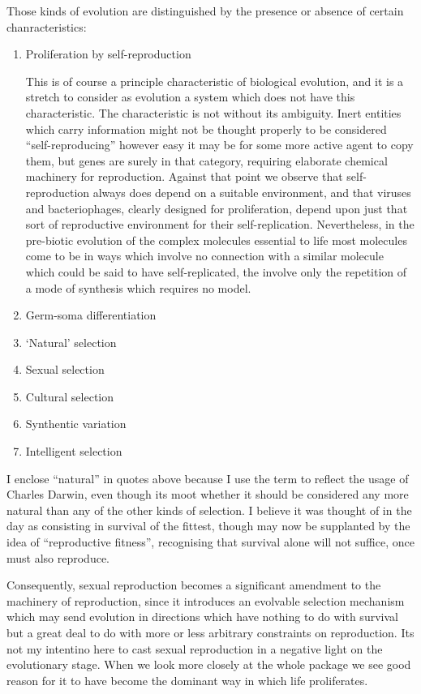{ Those kinds of evolution are distinguished by the presence or absence of certain chanracteristics:

 \renewcommand{\theenumi}{\alph{enumi}}

\begin{enumerate}
\item Proliferation by self-reproduction

  This is of course a principle characteristic of biological evolution, and it is a stretch to consider as evolution a system which does not have this characteristic.
  The characteristic is not without its ambiguity.
  Inert entities which carry information might not be thought properly to be considered ``self-reproducing'' however easy it may be for some more active agent to copy them, but genes are surely in that category, requiring elaborate chemical machinery for reproduction.
  Against that point we observe that self-reproduction always does depend on a suitable environment, and that viruses and bacteriophages, clearly designed for proliferation, depend upon just that sort of reproductive environment for their self-replication.
  Nevertheless, in the pre-biotic evolution of the complex molecules essential to life most molecules come to be in ways which involve no connection with a similar molecule which could be said to have self-replicated, the involve only the repetition of a mode of synthesis which requires no model.
  
\item Germ-soma differentiation
\item `Natural' selection
\item Sexual selection
\item Cultural selection
\item Synthentic variation
\item Intelligent selection
\end{enumerate}

 I enclose ``natural'' in quotes above because I use the term to reflect the usage of Charles Darwin, even though its moot whether it should be considered any more natural than any of the other kinds of selection.
 I believe it was thought of in the day as consisting in survival of the fittest, though may now be supplanted by the idea of  ``reproductive fitness'', recognising that survival alone will not suffice, once must also reproduce.

 Consequently, sexual reproduction becomes a significant amendment to the machinery of reproduction, since it introduces an evolvable selection mechanism which may send evolution in directions which have nothing to do with survival but a great deal to do with more or less arbitrary constraints on reproduction.
 Its not my intentino here to cast sexual reproduction in a negative light on the evolutionary stage.
 When we look more closely at the whole package we see good reason for it to have become the dominant way in which life proliferates.

}
